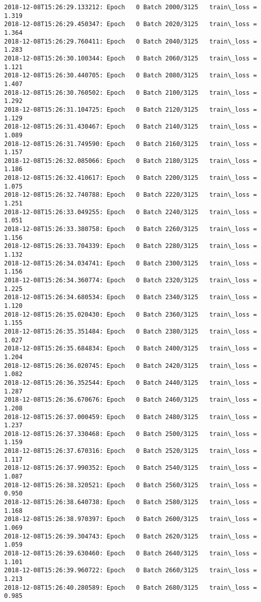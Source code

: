 \documentclass[11pt]{article}
\begin{document}
\begin{Verbatim}[commandchars=\\\{\}]
2018-12-08T15:26:29.133212: Epoch   0 Batch 2000/3125   train\_loss = 1.319
2018-12-08T15:26:29.450347: Epoch   0 Batch 2020/3125   train\_loss = 1.364
2018-12-08T15:26:29.760411: Epoch   0 Batch 2040/3125   train\_loss = 1.283
2018-12-08T15:26:30.100344: Epoch   0 Batch 2060/3125   train\_loss = 1.121
2018-12-08T15:26:30.440705: Epoch   0 Batch 2080/3125   train\_loss = 1.407
2018-12-08T15:26:30.760502: Epoch   0 Batch 2100/3125   train\_loss = 1.292
2018-12-08T15:26:31.104725: Epoch   0 Batch 2120/3125   train\_loss = 1.129
2018-12-08T15:26:31.430467: Epoch   0 Batch 2140/3125   train\_loss = 1.089
2018-12-08T15:26:31.749590: Epoch   0 Batch 2160/3125   train\_loss = 1.157
2018-12-08T15:26:32.085066: Epoch   0 Batch 2180/3125   train\_loss = 1.186
2018-12-08T15:26:32.410617: Epoch   0 Batch 2200/3125   train\_loss = 1.075
2018-12-08T15:26:32.740788: Epoch   0 Batch 2220/3125   train\_loss = 1.251
2018-12-08T15:26:33.049255: Epoch   0 Batch 2240/3125   train\_loss = 1.051
2018-12-08T15:26:33.380758: Epoch   0 Batch 2260/3125   train\_loss = 1.156
2018-12-08T15:26:33.704339: Epoch   0 Batch 2280/3125   train\_loss = 1.132
2018-12-08T15:26:34.034741: Epoch   0 Batch 2300/3125   train\_loss = 1.156
2018-12-08T15:26:34.360774: Epoch   0 Batch 2320/3125   train\_loss = 1.225
2018-12-08T15:26:34.680534: Epoch   0 Batch 2340/3125   train\_loss = 1.120
2018-12-08T15:26:35.020430: Epoch   0 Batch 2360/3125   train\_loss = 1.155
2018-12-08T15:26:35.351484: Epoch   0 Batch 2380/3125   train\_loss = 1.027
2018-12-08T15:26:35.684834: Epoch   0 Batch 2400/3125   train\_loss = 1.204
2018-12-08T15:26:36.020745: Epoch   0 Batch 2420/3125   train\_loss = 1.082
2018-12-08T15:26:36.352544: Epoch   0 Batch 2440/3125   train\_loss = 1.287
2018-12-08T15:26:36.670676: Epoch   0 Batch 2460/3125   train\_loss = 1.208
2018-12-08T15:26:37.000459: Epoch   0 Batch 2480/3125   train\_loss = 1.237
2018-12-08T15:26:37.330468: Epoch   0 Batch 2500/3125   train\_loss = 1.159
2018-12-08T15:26:37.670316: Epoch   0 Batch 2520/3125   train\_loss = 1.117
2018-12-08T15:26:37.990352: Epoch   0 Batch 2540/3125   train\_loss = 1.087
2018-12-08T15:26:38.320521: Epoch   0 Batch 2560/3125   train\_loss = 0.950
2018-12-08T15:26:38.640738: Epoch   0 Batch 2580/3125   train\_loss = 1.168
2018-12-08T15:26:38.970397: Epoch   0 Batch 2600/3125   train\_loss = 1.069
2018-12-08T15:26:39.304743: Epoch   0 Batch 2620/3125   train\_loss = 1.059
2018-12-08T15:26:39.630460: Epoch   0 Batch 2640/3125   train\_loss = 1.101
2018-12-08T15:26:39.960722: Epoch   0 Batch 2660/3125   train\_loss = 1.213
2018-12-08T15:26:40.280589: Epoch   0 Batch 2680/3125   train\_loss = 0.985

\end{Verbatim}
\end{document}
